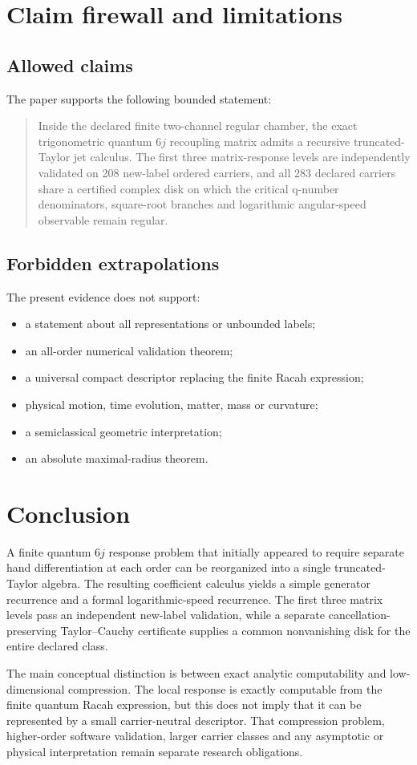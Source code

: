 \section{Claim firewall and limitations}
\subsection{Allowed claims}
The paper supports the following bounded statement:

\begin{quote}
Inside the declared finite two-channel regular chamber, the exact trigonometric quantum $6j$ recoupling matrix admits a recursive truncated-Taylor jet calculus.  The first three matrix-response levels are independently validated on 208 new-label ordered carriers, and all 283 declared carriers share a certified complex disk on which the critical q-number denominators, square-root branches and logarithmic angular-speed observable remain regular.
\end{quote}

\subsection{Forbidden extrapolations}
The present evidence does not support:
\begin{itemize}[leftmargin=2em]
\item a statement about all representations or unbounded labels;
\item an all-order numerical validation theorem;
\item a universal compact descriptor replacing the finite Racah expression;
\item physical motion, time evolution, matter, mass or curvature;
\item a semiclassical geometric interpretation;
\item an absolute maximal-radius theorem.
\end{itemize}

\section{Conclusion}
A finite quantum $6j$ response problem that initially appeared to require separate hand differentiation at each order can be reorganized into a single truncated-Taylor algebra.  The resulting coefficient calculus yields a simple generator recurrence and a formal logarithmic-speed recurrence.  The first three matrix levels pass an independent new-label validation, while a separate cancellation-preserving Taylor--Cauchy certificate supplies a common nonvanishing disk for the entire declared class.

The main conceptual distinction is between exact analytic computability and low-dimensional compression.  The local response is exactly computable from the finite quantum Racah expression, but this does not imply that it can be represented by a small carrier-neutral descriptor.  That compression problem, higher-order software validation, larger carrier classes and any asymptotic or physical interpretation remain separate research obligations.
